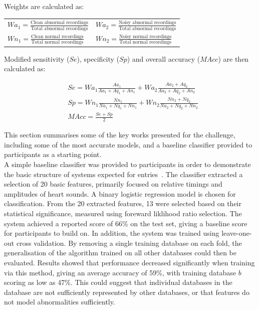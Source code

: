 \documentclass[titlepage, 12pt]{scrartcl} \usepackage{enumitem}
\begin{document}
\doublespacing

Weights are calculated as:
\begin{table}[H]
\centering
\doublespacing
\begin{tabular}{ll}
$Wa_1 = \frac{\text{Clean abnormal recordings}}{\text{Total abnormal recordings}}$ & $Wa_2 = \frac{\text{Noisy abnormal recordings}}{\text{Total abnormal recordings}}$ \\
$Wn_1 = \frac{\text{Clean normal recordings}}{\text{Total normal recordings}}$     & $Wn_2 = \frac{\text{Noisy normal recordings}}{\text{Total normal recordings}}$
\end{tabular}
\end{table}

Modified sensitivity ($Se$), specificity ($Sp$) and overall accuracy ($MAcc$) are then calculated as:

\begin{align*}
    &Se=Wa_1\frac{Aa_1}{Aa_1+Aq_1+An_1}+Wa_2\frac{Aa_2+Aq_2}{Aa_2+Aq_2+An_2} \\
    &Sp=Wn_1\frac{Nn_1}{Na_1+Nq_1+Nn_1}+Wn_2\frac{Nn_2+Nq_2}{Na_2+Nq_2+Nn_2} \\
    &MAcc=\frac{Se+Sp}{2}
\end{align*}

This section summarises some of the key works presented for the challenge,
including some of the most accurate models, and a baseline classifier
provided to participants as a starting point.\\

A simple baseline classifier was provided to participants in order to
demonstrate the basic structure of systems expected for
entries~\parencite{Liu2016}. The classifier extracted a selection of 20 basic
features, primarily focused on relative timings and amplitudes of heart sounds.
A binary logistic regression model is chosen for classification. From the 20
extracted features, 13 were selected based on their statistical significance,
measured using foreward liklihood ratio selection. The system achieved a
reported score of 66\% on the test set, giving a baseline score for participants
to build on.  In addition, the system was trained using leave-one-out cross
validation. By removing a single training database on each fold, the
generalisation of the algorithm trained on all other databases could then be
evaluated. Results showed that performance decreased significantly when
training via this method, giving an average accuracy of 59\%, with training
database $b$ scoring as low as 47\%.  This could suggest that individual
databases in the database are not sufficiently represented by other databases,
or that features do not model abnormalities sufficiently.\\
\end{document}
